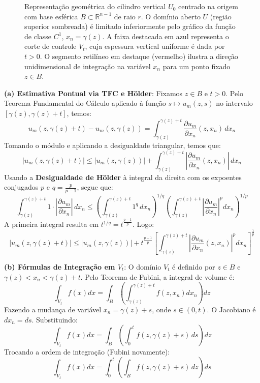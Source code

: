 \documentclass[cs_edp_2026.1.tex]{subfiles} %
\begin{document}
{\begin{figure}[htbp!]
\begin{center}
\begin{tikzpicture}[scale=1.3, >=stealth]
		\end{tikzpicture}
	\end{center}
	\caption*{\footnotesize{Representação geométrica do cilindro vertical $U_0$ centrado na origem com base esférica $B \subset \mathbb{R}^{n-1}$ de raio $r$. O domínio aberto $U$ (região superior sombreada) é limitado inferiormente pelo gráfico da função de classe $C^1$, $x_n = \gamma(z)$. A faixa destacada em azul representa o corte de controle $V_t$, cuja espessura vertical uniforme é dada por $t > 0$. O segmento retilíneo em destaque (vermelho) ilustra a direção unidimensional de integração na variável $x_n$ para um ponto fixado $z \in B$.}}
	\label{fig:nucleo_traco}
\end{figure}
	\textbf{(a) Estimativa Pontual via TFC e Hölder}:
	Fixamos $z \in B$ e $t > 0$. Pelo Teorema Fundamental do Cálculo aplicado à função $s \mapsto u_m(z, s)$ no intervalo $[\gamma(z), \gamma(z)+t]$, temos:
	$$u_m(z, \gamma(z) + t) - u_m(z, \gamma(z)) = \int_{\gamma(z)}^{\gamma(z)+t} \frac{\partial u_m}{\partial x_n}(z, x_n) \, dx_n$$
	Tomando o módulo e aplicando a desigualdade triangular, temos que:
	$$|u_m(z, \gamma(z) + t)| \le |u_m(z, \gamma(z))| + \int_{\gamma(z)}^{\gamma(z)+t} \left| \frac{\partial u_m}{\partial x_n}(z, x_n) \right| \, dx_n$$
	Usando a \textbf{Desigualdade de Hölder} à integral da direita com os expoentes conjugados $p$ e $q = \tfrac{p}{p-1}$, segue que:
	$$\int_{\gamma(z)}^{\gamma(z)+t} 1 \cdot \left| \frac{\partial u_m}{\partial x_n} \right| \, dx_n \le \left( \int_{\gamma(z)}^{\gamma(z)+t} 1^q \, dx_n \right)^{1/q} \left( \int_{\gamma(z)}^{\gamma(z)+t} \left| \frac{\partial u_m}{\partial x_n} \right|^p dx_n \right)^{1/p}$$
	A primeira integral resulta em $t^{1/q} = t^{\frac{p-1}{p}}$. Logo:
	$$\boxed{|u_m(z, \gamma(z) + t)| \le |u_m(z, \gamma(z))| + t^{\frac{p-1}{p}} \left[ \int_{\gamma(z)}^{\gamma(z)+t} \left| \frac{\partial u_m}{\partial x_n}(z, x_n) \right|^p dx_n \right]^{\frac{1}{p}}}$$
	
	\textbf{(b) Fórmulas de Integração em $V_t$}:
	O domínio $V_t$ é definido por $z \in B$ e $\gamma(z) < x_n < \gamma(z) + t$. Pelo Teorema de Fubini, a integral de volume é:
	$$\int_{V_t} f(x) dx = \int_B \left( \int_{\gamma(z)}^{\gamma(z)+t} f(z, x_n) dx_n \right) dz$$
	Fazendo a mudança de variável $x_n = \gamma(z) + s$, onde $s \in (0, t)$. O Jacobiano é $dx_n = ds$. Substituindo:
	$$\int_{V_t} f(x) dx = \int_B \left( \int_0^t f(z, \gamma(z) + s) \, ds \right) dz$$
	Trocando a ordem de integração (Fubini novamente):
	$$\boxed{\int_{V_t} f(x) dx = \int_0^t \left( \int_B f(z, \gamma(z) + s) \, dz \right) ds}$$
	
}
\end{document}
